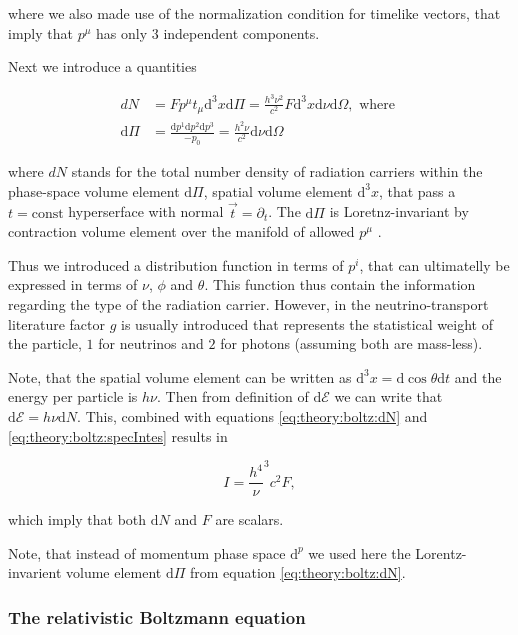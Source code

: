 \documentclass[11pt,a4paper,headinclude=true,DIV=14,BCOR=8mm,chapterprefix,listof=totoc,twoside,openright,abstracton]{scrbook}
\begin{document}
where we also made use of the normalization condition for timelike vectors, that imply that $p^{\mu}$ has only $3$ independent components.

Next we introduce a quantities

\begin{align}
    dN &= F p^{\mu}t_{\mu}\text{d}^3 x\text{d}\Pi = \frac{h^3\nu^2}{c^2}F\text{d}^3x\text{d}\nu\text{d}\Omega, \text{ where } \\
    \text{d}\Pi &= \frac{\text{d}p^1\text{d}p^2\text{d}p^3}{-p_0} =\frac{h^2\nu}{c^2}\text{d}\nu\text{d}\Omega
    \label{eq:theory:boltz:dN}
\end{align}

where $dN$ stands for the total number density of radiation carriers within the phase-space volume element $\text{d}\Pi$, spatial volume element $\text{d}^3 x$, that pass a $t=\text{const}$ hyperserface with normal $\vec{t} = \partial_t$. The $\text{d}\Pi$ is Loretnz-invariant by contraction volume element over the manifold of allowed $p^{\mu}$ \cite{Cercignani:2002}.

Thus we introduced a distribution function in terms of $p^i$, that can ultimatelly be expressed in terms of $\nu$, $\phi$ and $\theta$. This function thus contain the information regarding the type of the radiation carrier. However, in the neutrino-transport literature factor $g$ is usually introduced that represents the statistical weight of the particle, $1$ for neutrinos and $2$ for photons (assuming both are mass-less). 

Note, that the spatial volume element can be written as $\text{d}^3x = \text{d}\cos\theta\text{d}t$ and the energy per particle is $h\nu$. Then from definition of $\text{d}\mathcal{E}$ we can write that $\text{d}\mathcal{E} = h\nu\text{d}N$. This, combined with equations \ref{eq:theory:boltz:dN} and \ref{eq:theory:boltz:specIntes} results in 

\begin{equation}
    I = \frac{h^4} \nu^3{c^2}F,
    \label{eq:theory:boltz:IasF}
\end{equation}

which imply that both $\text{d}N$ and $F$ are scalars.

Note, that instead of momentum phase space $\text{d}^p$ we used here the Lorentz-invarient volume element $\text{d}\Pi$ from equation \ref{eq:theory:boltz:dN}. 

\subsubsection{The relativistic Boltzmann equation}
\end{document}
